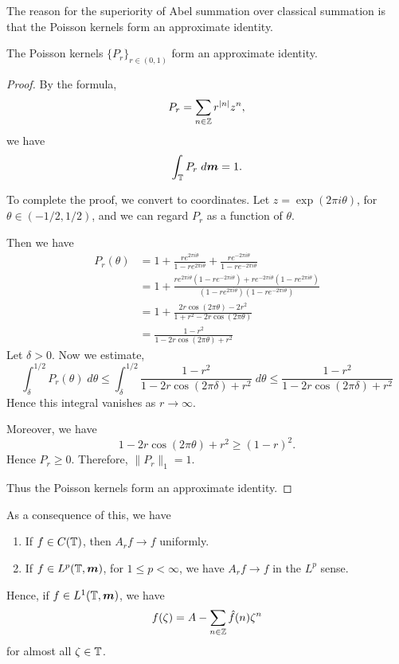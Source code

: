 The reason for the superiority of Abel summation
over classical summation is that the Poisson kernels form an approximate identity.
\begin{proposition}
    The Poisson kernels $\{P_r\}_{r \in (0,1)}$ form an approximate
    identity.
\end{proposition}
\begin{proof}
    By the formula,
    \begin{equation*}
        P_r = \sum_{n \in \mathbb{Z}} r^{|n|} z^n,
    \end{equation*}
    we have
    \begin{equation*}
        \int_{\mathbb{T}} P_r\;d\boldsymbol{m} = 1.
    \end{equation*}
    
    To complete the proof, we convert to coordinates. Let $z = \exp(2\pi i\theta)$,
    for $\theta \in (-1/2,1/2)$, and we can regard $P_r$ as a function of $\theta$.
    
    Then we have
    \begin{align*}
        P_r(\theta) &= 1 + \frac{re^{2\pi i \theta}}{1-re^{2\pi i \theta}}+\frac{re^{-2\pi i \theta}}{1-re^{-2\pi i \theta}}\\
        &= 1 + \frac{re^{2\pi i \theta}(1-re^{-2\pi i \theta})+re^{-2\pi i\theta}(1-re^{2\pi i \theta})}{(1-re^{2\pi i \theta})(1-re^{-2\pi i \theta})}\\
        &= 1 + \frac{2r\cos(2\pi \theta)-2r^2}{1+r^2-2r\cos(2\pi \theta)}\\
        &= \frac{1-r^2}{1-2r\cos(2\pi\theta)+r^2}
    \end{align*}
    Let $\delta > 0$. 
    Now we estimate,
    \begin{equation*}
        \int_{\delta}^{1/2} P_r(\theta)\; d\theta \leq \int_\delta^{1/2} \frac{1-r^2}{1-2r\cos(2\pi \delta)+r^2}\;d\theta \leq \frac{1-r^2}{1-2r\cos(2\pi \delta)+r^2}
    \end{equation*}
    Hence this integral vanishes as $r\rightarrow\infty$.
    
    Moreover, we have
    \begin{equation*}
        1-2r\cos(2\pi \theta) + r^2 \geq (1-r)^2.
    \end{equation*}
    Hence $P_r \geq 0$. Therefore, $\|P_r\|_1 = 1$.
    
    Thus the Poisson kernels form an approximate identity.
\end{proof}
As a consequence of this, we have
\begin{enumerate}
    \item{} If $f \in C(\mathbb{T})$, then $A_r f\rightarrow f$ uniformly.
    \item{} If $f \in L^p(\mathbb{T},\boldsymbol{m})$, for $1\leq p < \infty$, we have $A_rf\rightarrow f$
    in the $L^p$ sense.
\end{enumerate}
Hence, if $f \in L^1(\mathbb{T},\boldsymbol{m})$, we have
\begin{equation*}
    f(\zeta) = A-\sum_{n \in \mathbb{Z}} \hat{f}(n)\zeta^n
\end{equation*}
for almost all $\zeta \in \mathbb{T}$.

